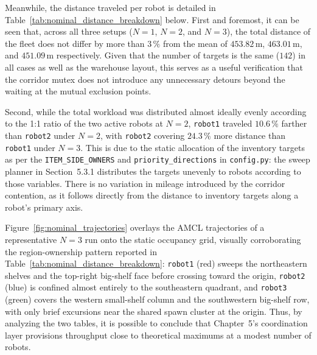 \begin{table}[htbp]
\centering
\caption{Per-robot traveled distance (mean of three runs) under nominal fleet-size configurations.}
\label{tab:nominal_distance_breakdown}
\end{table}

Meanwhile, the distance traveled per robot is detailed in Table~\ref{tab:nominal_distance_breakdown} below. First and foremost, it can be seen that, across all three setups ($N=1$, $N=2$, and $N=3$), the total distance of the fleet does not differ by more than $3\,\%$ from the mean of $453.82\,\text{m}$, $463.01\,\text{m}$, and $451.09\,\text{m}$ respectively. Given that the number of targets is the same ($142$) in all cases as well as the warehouse layout, this serves as a useful verification that the corridor mutex does not introduce any unnecessary detours beyond the waiting at the mutual exclusion points.

Second, while the total workload was distributed almost ideally evenly according to the 1:1 ratio of the two active robots at $N=2$, \texttt{robot1} traveled $10.6\,\%$ farther than \texttt{robot2} under $N=2$, with \texttt{robot2} covering $24.3\,\%$ more distance than \texttt{robot1} under $N=3$. This is due to the static allocation of the inventory targets as per the \texttt{ITEM\_SIDE\_OWNERS} and \texttt{priority\_directions} in \texttt{config.py}: the sweep planner in Section~5.3.1 distributes the targets unevenly to robots according to those variables. There is no variation in mileage introduced by the corridor contention, as it follows directly from the distance to inventory targets along a robot's primary axis.

Figure~\ref{fig:nominal_trajectories} overlays the AMCL trajectories of a representative $N=3$ run onto the static occupancy grid, visually corroborating the region-ownership pattern reported in Table~\ref{tab:nominal_distance_breakdown}: \texttt{robot1} (red) sweeps the northeastern shelves and the top-right big-shelf face before crossing toward the origin, \texttt{robot2} (blue) is confined almost entirely to the southeastern quadrant, and \texttt{robot3} (green) covers the western small-shelf column and the southwestern big-shelf row, with only brief excursions near the shared spawn cluster at the origin. Thus, by analyzing the two tables, it is possible to conclude that Chapter~5's coordination layer provisions throughput close to theoretical maximums at a modest number of robots.

